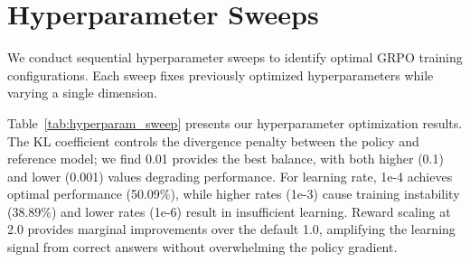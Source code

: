 \documentclass{article}
\begin{document}




\newpage
\appendix
\onecolumn
\section{Hyperparameter Sweeps}
\label{sec:hyperparam_sweeps}

We conduct sequential hyperparameter sweeps to identify optimal GRPO training configurations. Each sweep fixes previously optimized hyperparameters while varying a single dimension.


\ablationhyperparameters
Table~\ref{tab:hyperparam_sweep} presents our hyperparameter optimization results. The KL coefficient controls the divergence penalty between the policy and reference model; we find 0.01 provides the best balance, with both higher (0.1) and lower (0.001) values degrading performance. For learning rate, 1e-4 achieves optimal performance (50.09\%), while higher rates (1e-3) cause training instability (38.89\%) and lower rates (1e-6) result in insufficient learning. Reward scaling at 2.0 provides marginal improvements over the default 1.0, amplifying the learning signal from correct answers without overwhelming the policy gradient.
\end{document}
